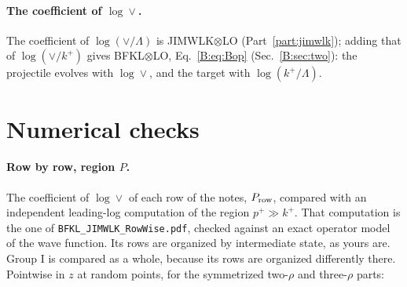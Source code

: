 \documentclass[10pt]{article}
\numberwithin{equation}{section}
\newcommand{\kp}{k^+}
\newcommand{\pp}{p^+}
\begin{document}
\paragraph{The coefficient of $\log\vee$.} The coefficient of $\log(\vee/\Lambda)$ is JIMWLK$\otimes$LO (Part~\ref{part:jimwlk}); adding that of $\log(\vee/k^+)$ gives BFKL$\otimes$LO, Eq.~\eqref{B:eq:Bop} (Sec.~\ref{B:sec:two}): the projectile evolves with $\log\vee$, and the target with $\log(k^+/\Lambda)$.


\section{Numerical checks}\label{B:sec:checks}
\paragraph{Row by row, region $P$.} The coefficient of $\log\vee$ of each row of the notes, $P_{\rm row}$, compared with an independent leading-log computation of the region $\pp\gg\kp$. That computation is the one of \texttt{BFKL\_JIMWLK\_RowWise.pdf}, checked against an exact operator model of the wave function. Its rows are organized by intermediate state, as yours are. Group I is compared as a whole, because its rows are organized differently there. Pointwise in $z$ at random points, for the symmetrized two-$\rho$ and three-$\rho$ parts:
\end{document}

